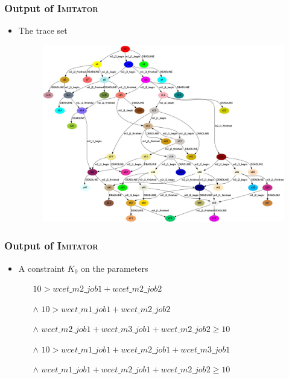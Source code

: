 \documentclass[professionalfont]{beamer}
\newcommand{\couleur}[1]{\textcolor{couleurimportante}{#1}}
\newcommand{\imitator}{\textsc{Imitator}}
\begin{document}
\begin{frame}
	\frametitle{Output of \imitator{}}
	\begin{itemize}
		\item The \couleur{trace set}
		\begin{figure}[!ht]
			\centering
			\includegraphics[scale = 0.12]{./figures/trace_set.jpg}
		\end{figure}
	\end{itemize}
\end{frame}
\begin{frame}
	\frametitle{Output of \imitator{}}
	\begin{itemize}
		\item A \couleur{constraint} $K_0$ on the parameters 
		\medskip
		\begin{itemize}
			\item[]   $10 > wcet\_m2\_job1 + wcet\_m2\_job2$
			\item[$\wedge$] $10 > wcet\_m1\_job1 + wcet\_m2\_job2$
			\item[$\wedge$] $wcet\_m2\_job1 + wcet\_m3\_job1 + wcet\_m2\_job2 \geq 10$
			\item[$\wedge$] $10 > wcet\_m1\_job1 + wcet\_m2\_job1 + wcet\_m3\_job1$
			\item[$\wedge$] $wcet\_m1\_job1 + wcet\_m2\_job1 + wcet\_m2\_job2 \geq 10$
		\end{itemize}
	\end{itemize}
\end{frame}
\end{document}

